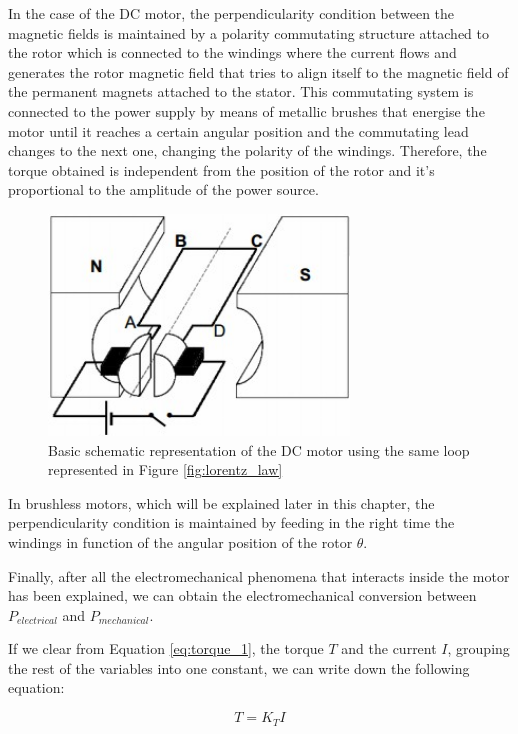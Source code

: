 In the case of the \acf{DC} motor, the perpendicularity condition between the magnetic fields is maintained by a polarity commutating structure attached to the rotor which is connected to the windings where the current flows and generates the rotor magnetic field that tries to align itself to the magnetic field of the permanent magnets attached to the stator. This commutating system is connected to the power supply by means of metallic brushes that energise the motor until it reaches a certain angular position and the commutating lead changes to the next one, changing the polarity of the windings. Therefore, the torque obtained is independent from the position of the rotor and it’s proportional to the amplitude of the power source.

\begin{figure}[htbp]
\centering
\includegraphics[width=8cm]{Images/dc_motor.png} 
\caption[DC Motor Scheme]{Basic schematic representation of the \ac{DC} motor using the same loop represented in Figure \ref{fig:lorentz_law}}
\label{fig:dc_motor}
\end{figure}

In brushless motors, which will be explained later in this chapter, the perpendicularity condition is maintained by feeding in the right time the windings in function of the angular position of the rotor $\theta$.

Finally, after all the electromechanical phenomena that interacts inside the motor has been explained, we can obtain the electromechanical conversion between $P_{electrical}$ and $P_{mechanical}$.

If we clear from Equation \ref{eq:torque_1}, the torque $T$ and the current $I$, grouping the rest of the variables into one constant, we can write down the following equation:

\begin{equation}
	\label{eq:kt}
	T = K_{T} I
\end{equation}

